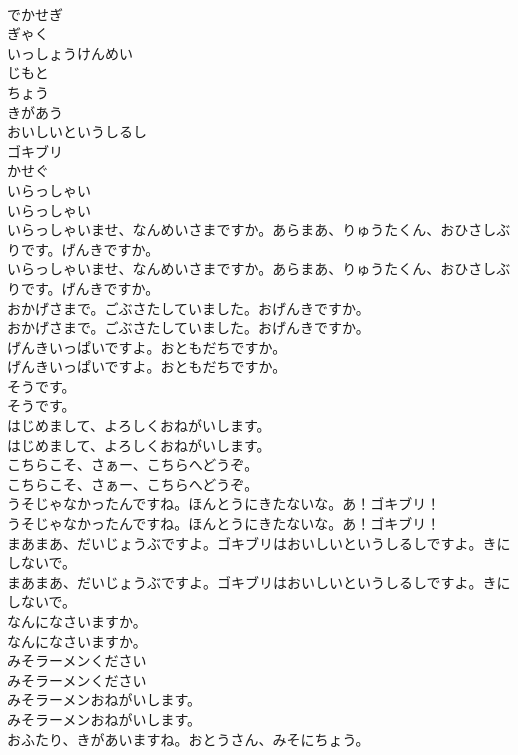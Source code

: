 \documentclass[8pt]{extreport}
\begin{document}
\begin{CJK}{UTF8}{min}
\\	でかせぎ
\\	ぎゃく
\\	いっしょうけんめい
\\	じもと
\\	ちょう
\\	きがあう
\\	おいしいというしるし
\\	ゴキブリ
\\	かせぐ
\\	いらっしゃい
\\	いらっしゃい
\\	いらっしゃいませ、なんめいさまですか。あらまあ、りゅうたくん、おひさしぶりです。げんきですか。
\\	いらっしゃいませ、なんめいさまですか。あらまあ、りゅうたくん、おひさしぶりです。げんきですか。
\\	おかげさまで。ごぶさたしていました。おげんきですか。
\\	おかげさまで。ごぶさたしていました。おげんきですか。
\\	げんきいっぱいですよ。おともだちですか。
\\	げんきいっぱいですよ。おともだちですか。
\\	そうです。
\\	そうです。
\\	はじめまして、よろしくおねがいします。
\\	はじめまして、よろしくおねがいします。
\\	こちらこそ、さぁー、こちらへどうぞ。
\\	こちらこそ、さぁー、こちらへどうぞ。
\\	うそじゃなかったんですね。ほんとうにきたないな。あ！ゴキブリ！
\\	うそじゃなかったんですね。ほんとうにきたないな。あ！ゴキブリ！
\\	まあまあ、だいじょうぶですよ。ゴキブリはおいしいというしるしですよ。きにしないで。
\\	まあまあ、だいじょうぶですよ。ゴキブリはおいしいというしるしですよ。きにしないで。
\\	なんになさいますか。
\\	なんになさいますか。
\\	みそラーメンください
\\	みそラーメンください
\\	みそラーメンおねがいします。
\\	みそラーメンおねがいします。
\\	おふたり、きがあいますね。おとうさん、みそにちょう。

\end{CJK}
\end{document}
